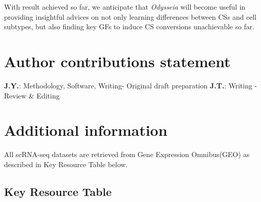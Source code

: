 \documentclass[fleqn,10pt]{wlscirep}
\begin{document}
With result achieved so far, we anticipate that \emph{Odysseia} will become useful in providing insightful advices on not only learning differences between CSs and cell subtypes, but also finding key GFs to induce CS conversions unachievable so far.





\section*{Author contributions statement}
\textbf{J.Y.}: Methodology, Software, Writing- Original draft preparation
\textbf{J.T.}: Writing - Review \& Editing

\section*{Additional information}
All scRNA-seq datasets are retrieved from Gene Expression Omnibus(GEO) as described in Key Resource Table below.


\subsection*{Key Resource Table}
\end{document}
